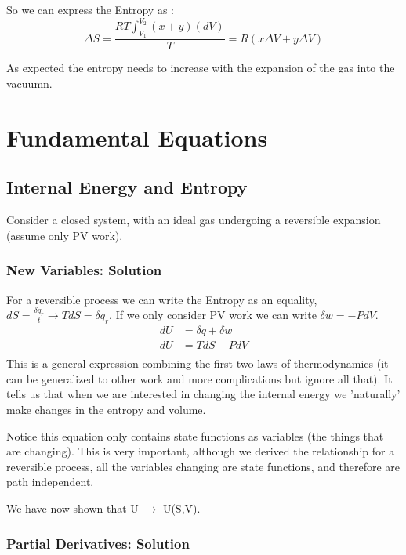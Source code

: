 \documentclass{article}
\newcommand{\be}{\begin{equation}}
\newcommand{\ee}{\end{equation}}
\begin{document}
So we can express the Entropy as : 
\be
\Delta S = \frac{RT\int_{V_1}^{V_2} (x+y)(dV)}{T} = R(x\Delta V + y\Delta V) 
\ee

As expected the entropy needs to increase with the expansion of the gas into the vacuumn. 

\section{Fundamental Equations}

\subsection{Internal Energy and Entropy}
Consider a closed system, with an ideal gas undergoing a reversible expansion (assume only PV work). 

\subsubsection{New Variables: Solution}

For a reversible process we can write the Entropy as an equality, $dS =\frac{\delta q_r}{t} \rightarrow TdS = \delta q_r$. 
If we only consider PV work we can write $\delta w = -PdV$. 
\begin{equation}
    \begin{split}
        dU &= \delta q + \delta w \\
        dU &= TdS - PdV \\
    \end{split}
\end{equation}
This is a general expression combining the first two laws of thermodynamics (it can be generalized to other work and more complications but ignore all that). 
It tells us that when we are interested in changing the internal energy we 'naturally' make changes in the entropy and volume. 

Notice this equation only contains state functions as variables (the things that are changing).
This is very important, although we derived the relationship for a reversible process, all the variables changing are state functions, and therefore are path independent. 
 
We have now shown that U $\rightarrow$ U(S,V). 

\subsubsection{Partial Derivatives: Solution}
\end{document}
